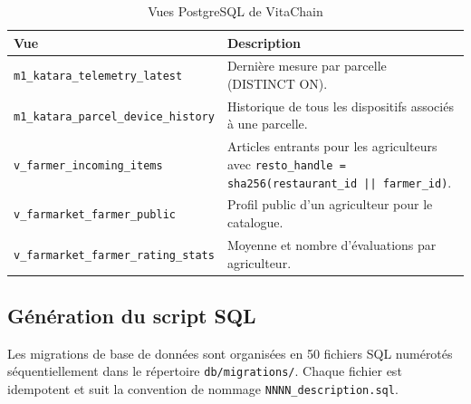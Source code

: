 \documentclass[12pt,a4paper]{report}
\newcommand{\code}[1]{\texttt{\small #1}}
\begin{document}
\begin{table}[H]
  \centering
  \caption{Vues PostgreSQL de VitaChain}
  \label{tab:vues}
  \small
  \begin{tabularx}{\linewidth}{lX}
    \toprule
    \textbf{Vue} & \textbf{Description} \\
    \midrule
    \code{m1\_katara\_telemetry\_latest}
      & Dernière mesure par parcelle (DISTINCT ON). \\
    \code{m1\_katara\_parcel\_device\_history}
      & Historique de tous les dispositifs associés à une parcelle. \\
    \code{v\_farmer\_incoming\_items}
      & Articles entrants pour les agriculteurs avec
        \code{resto\_handle = sha256(restaurant\_id || farmer\_id)}. \\
    \code{v\_farmarket\_farmer\_public}
      & Profil public d'un agriculteur pour le catalogue. \\
    \code{v\_farmarket\_farmer\_rating\_stats}
      & Moyenne et nombre d'évaluations par agriculteur. \\
    \bottomrule
  \end{tabularx}
\end{table}

\subsection{Génération du script SQL}

Les migrations de base de données sont organisées en 50 fichiers SQL numérotés
séquentiellement dans le répertoire \code{db/migrations/}. Chaque fichier est idempotent
et suit la convention de nommage \code{NNNN\_description.sql}.
\end{document}

